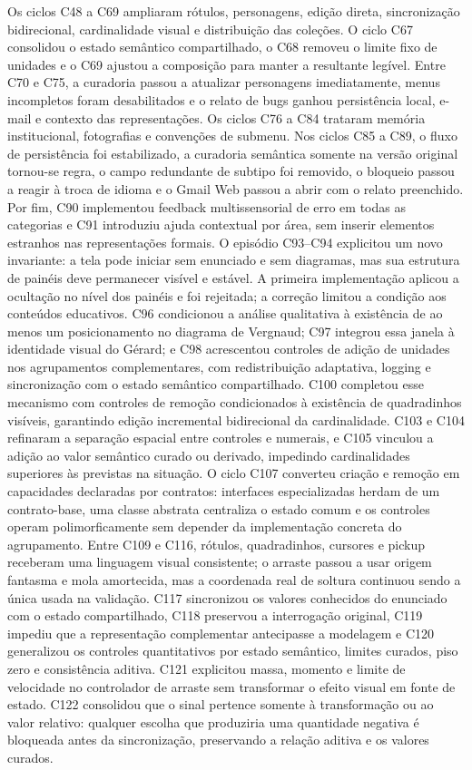 \documentclass[preprint,12pt,authoryear]{elsarticle}
\begin{document}
Os ciclos C48 a C69 ampliaram rótulos, personagens, edição direta, sincronização bidirecional, cardinalidade visual e distribuição das coleções. O ciclo C67 consolidou o estado semântico compartilhado, o C68 removeu o limite fixo de unidades e o C69 ajustou a composição para manter a resultante legível. Entre C70 e C75, a curadoria passou a atualizar personagens imediatamente, menus incompletos foram desabilitados e o relato de bugs ganhou persistência local, e-mail e contexto das representações. Os ciclos C76 a C84 trataram memória institucional, fotografias e convenções de submenu. Nos ciclos C85 a C89, o fluxo de persistência foi estabilizado, a curadoria semântica somente na versão original tornou-se regra, o campo redundante de subtipo foi removido, o bloqueio passou a reagir à troca de idioma e o Gmail Web passou a abrir com o relato preenchido. Por fim, C90 implementou feedback multissensorial de erro em todas as categorias e C91 introduziu ajuda contextual por área, sem inserir elementos estranhos nas representações formais. O episódio C93--C94 explicitou um novo invariante: a tela pode iniciar sem enunciado e sem diagramas, mas sua estrutura de painéis deve permanecer visível e estável. A primeira implementação aplicou a ocultação no nível dos painéis e foi rejeitada; a correção limitou a condição aos conteúdos educativos. C96 condicionou a análise qualitativa à existência de ao menos um posicionamento no diagrama de Vergnaud; C97 integrou essa janela à identidade visual do Gérard; e C98 acrescentou controles de adição de unidades nos agrupamentos complementares, com redistribuição adaptativa, logging e sincronização com o estado semântico compartilhado. C100 completou esse mecanismo com controles de remoção condicionados à existência de quadradinhos visíveis, garantindo edição incremental bidirecional da cardinalidade. C103 e C104 refinaram a separação espacial entre controles e numerais, e C105 vinculou a adição ao valor semântico curado ou derivado, impedindo cardinalidades superiores às previstas na situação. O ciclo C107 converteu criação e remoção em capacidades declaradas por contratos: interfaces especializadas herdam de um contrato-base, uma classe abstrata centraliza o estado comum e os controles operam polimorficamente sem depender da implementação concreta do agrupamento. Entre C109 e C116, rótulos, quadradinhos, cursores e pickup receberam uma linguagem visual consistente; o arraste passou a usar origem fantasma e mola amortecida, mas a coordenada real de soltura continuou sendo a única usada na validação. C117 sincronizou os valores conhecidos do enunciado com o estado compartilhado, C118 preservou a interrogação original, C119 impediu que a representação complementar antecipasse a modelagem e C120 generalizou os controles quantitativos por estado semântico, limites curados, piso zero e consistência aditiva. C121 explicitou massa, momento e limite de velocidade no controlador de arraste sem transformar o efeito visual em fonte de estado. C122 consolidou que o sinal pertence somente à transformação ou ao valor relativo: qualquer escolha que produziria uma quantidade negativa é bloqueada antes da sincronização, preservando a relação aditiva e os valores curados.
\end{document}
